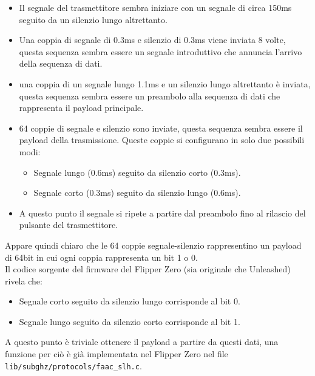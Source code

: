 \begin{itemize}
  \item Il segnale del trasmettitore sembra iniziare con un segnale di circa 150ms seguito da un silenzio lungo altrettanto.
  \item Una coppia di segnale di 0.3ms e silenzio di 0.3ms viene inviata 8 volte, questa sequenza sembra essere un segnale introduttivo che annuncia l’arrivo della sequenza di dati.
  \item una coppia di un segnale lungo 1.1ms e un silenzio lungo altrettanto è inviata, questa sequenza sembra essere un preambolo alla sequenza di dati che rappresenta il payload principale.
  \item 64 coppie di segnale e silenzio sono inviate, questa sequenza sembra essere il payload della trasmissione. Queste coppie si configurano in solo due possibili modi:
    \begin{itemize}
      \item Segnale lungo (0.6ms) seguito da silenzio corto (0.3ms).
      \item Segnale corto (0.3ms) seguito da silenzio lungo (0.6ms).
    \end{itemize}
  \item A questo punto il segnale si ripete a partire dal preambolo fino al rilascio del pulsante del trasmettitore.
\end{itemize}
Appare quindi chiaro che le 64 coppie segnale-silenzio rappresentino un payload di 64bit in cui ogni coppia rappresenta un bit 1 o 0.\\
Il codice sorgente del firmware del Flipper Zero (sia originale che Unleashed) rivela che:
\begin{itemize}
  \item Segnale corto seguito da silenzio lungo corrisponde al bit 0.
  \item Segnale lungo seguito da silenzio corto corrisponde al bit 1.
\end{itemize}
A questo punto è triviale ottenere il payload a partire da questi dati, una funzione per ciò è già implementata nel Flipper Zero nel file \texttt{lib/subghz/protocols/faac\_slh.c}\cite{firmware}.

